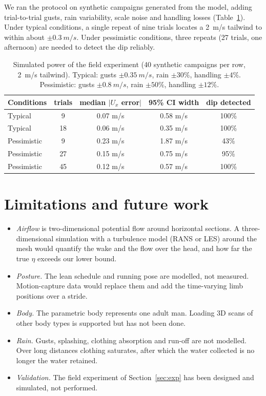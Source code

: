 \documentclass[11pt,a4paper]{article}
\begin{document}
We ran the protocol on synthetic campaigns generated from the model, adding trial-to-trial gusts, rain variability, scale noise and handling losses (Table~\ref{tab:power}). Under typical conditions, a single repeat of nine trials locates a \SI{2}{m/s} tailwind to within about $\pm\SI{0.3}{m/s}$. Under pessimistic conditions, three repeats (27 trials, one afternoon) are needed to detect the dip reliably.

\begin{table}[h]\centering
\caption{Simulated power of the field experiment (40 synthetic campaigns per row, \SI{2}{m/s} tailwind). Typical: gusts $\pm\SI{0.35}{m/s}$, rain $\pm30\%$, handling $\pm4\%$. Pessimistic: gusts $\pm\SI{0.8}{m/s}$, rain $\pm50\%$, handling $\pm12\%$.}\label{tab:power}
\begin{tabular}{lcccc}\toprule
Conditions & trials & median $|U_x$ error$|$ & 95\% CI width & dip detected\\\midrule
Typical & 9 & 0.07 m/s & 0.58 m/s & 100\%\\
Typical & 18 & 0.06 m/s & 0.35 m/s & 100\%\\
Pessimistic & 9 & 0.23 m/s & 1.87 m/s & 43\%\\
Pessimistic & 27 & 0.15 m/s & 0.75 m/s & 95\%\\
Pessimistic & 45 & 0.12 m/s & 0.57 m/s & 100\%\\\bottomrule
\end{tabular}
\end{table}

\section{Limitations and future work}
\begin{itemize}
\item \emph{Airflow} is two-dimensional potential flow around horizontal sections. A three-dimensional simulation with a turbulence model (RANS or LES) around the mesh would quantify the wake and the flow over the head, and how far the true $\eta$ exceeds our lower bound.
\item \emph{Posture.} The lean schedule and running pose are modelled, not measured. Motion-capture data would replace them and add the time-varying limb positions over a stride.
\item \emph{Body.} The parametric body represents one adult man. Loading 3D scans of other body types is supported but has not been done.
\item \emph{Rain.} Gusts, splashing, clothing absorption and run-off are not modelled. Over long distances clothing saturates, after which the water collected is no longer the water retained.
\item \emph{Validation.} The field experiment of Section~\ref{sec:exp} has been designed and simulated, not performed.
\end{itemize}
\end{document}
